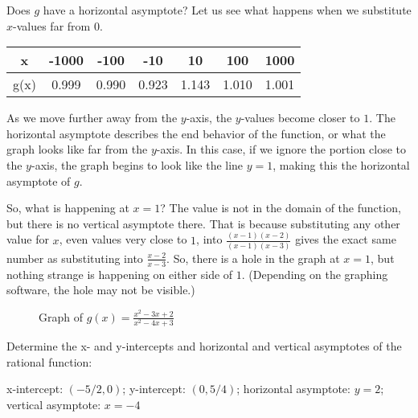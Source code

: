 Does \( g \) have a horizontal asymptote? Let us see what happens when we substitute \( x \)-values far from \( 0 \).

\begin{center}
\begin{tabular}{ |c|c|c|c|c|c|c| } 
 \hline
 x & -1000 & -100 & -10 & 10 & 100 & 1000 \\ 
 \hline
 g(x) & 0.999 & 0.990 & 0.923 & 1.143 & 1.010 & 1.001 \\ 
 \hline
\end{tabular}
\end{center}

As we move further away from the \( y \)-axis, the \( y \)-values become closer to \( 1 \). The horizontal asymptote describes the end behavior of the function, or what the graph looks like far from the \( y \)-axis. In this case, if we ignore the portion close to the \( y \)-axis, the graph begins to look like the line \( y = 1 \), making this the horizontal asymptote of \( g \). 

So, what is happening at \( x = 1 \)? The value is not in the domain of the function, but there is no vertical asymptote there. That is because substituting any other value for \( x \), even values very close to \( 1 \), into \( \frac{(x - 1)(x - 2)}{(x - 1)(x - 3)} \) gives the exact same number as substituting into \( \frac{x-2}{x-3} \). So, there is a hole in the graph at \( x = 1 \), but nothing strange is happening on either side of \( 1 \). (Depending on the graphing software, the hole may not be visible.)

\begin{figure}[htbp]
  \centering
  \caption{Graph of \( g(x) = \frac{x^2 - 3x + 2}{x^2 - 4x + 3} \)}
\end{figure}

\begin{Exercise}[title=Rational Functions Practice 1, label=ratfunc1]
  Determine the x- and y-intercepts and horizontal and vertical asymptotes of the rational function:
  \vspace{40mm}
\end{Exercise}
\begin{Answer}[ref=ratfunc1]x-intercept: $(-5/2, 0)$; y-intercept: $(0, 5/4)$; horizontal asymptote: $y = 2$; vertical asymptote: $x = -4$\end{Answer}

